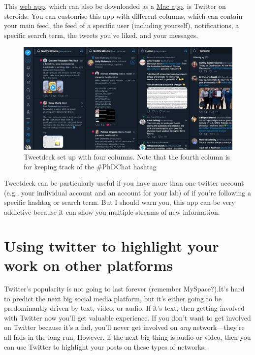 \documentclass[]{book}
\begin{document}
This \href{https://tweetdeck.com/}{web app}, which can also be downloaded as a \href{https://itunes.apple.com/gb/app/tweetdeck-by-twitter/id485812721?mt=12}{Mac app}, is Twitter on steroids. You can customise this app with different columns, which can contain your main feed, the feed of a specific user (including yourself), notifications, a specific search term, the tweets you've liked, and your messages.

\begin{figure}

\includegraphics[width=0.8\linewidth]{images/tweetdeck} \hfill{}

\caption{Tweetdeck set up with four columns. Note that the fourth column is for keeping track of the #PhDChat hashtag}\label{fig:unnamed-chunk-6}
\end{figure}

Tweetdeck can be particularly useful if you have more than one twitter account (e.g., your individual account and an account for your lab) of if you're following a specific hashtag or search term. But I should warn you, this app can be very addictive because it can show you multiple streams of new information.

\hypertarget{using-twitter-to-highlight-your-work-on-other-platforms}{%
\section{Using twitter to highlight your work on other platforms}\label{using-twitter-to-highlight-your-work-on-other-platforms}}

Twitter's popularity is not going to last forever (remember MySpace?).It's hard to predict the next big social media platform, but it's either going to be predominantly driven by text, video, or audio. If it's text, then getting involved with Twitter now you'll get valuable experience. If you don't want to get involved on Twitter because it's a fad, you'll never get involved on \emph{any} network---they're all fads in the long run. However, if the next big thing is audio or video, then you can use Twitter to highlight your posts on these types of networks.
\end{document}
